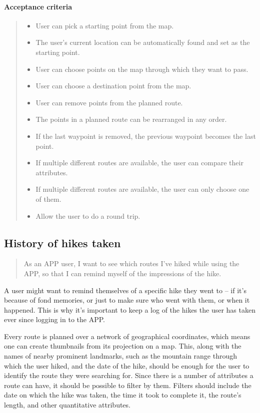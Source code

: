 \paragraph*{Acceptance criteria}
\begin{quote}
\begin{itemize}
    \item User can pick a starting point from the map.
    \item The user's current location can be automatically found and set as the starting point.
    \item User can choose points on the map through which they want to pass.
    \item User can choose a destination point from the map.
    \item User can remove points from the planned route.
    \item The points in a planned route can be rearranged in any order.
    \item If the last waypoint is removed, the previous waypoint becomes the last point.
    \item If multiple different routes are available, the user can compare their attributes.
    \item If multiple different routes are available, the user can only choose one of them.
    \item Allow the user to do a round trip.
\end{itemize}
\end{quote}

\subsection{History of hikes taken}\label{US:map-history}
\begin{quote}
As an APP user, I want to see which routes I've hiked while using the APP, so that I can remind myself of the impressions of the hike.
\end{quote}

A user might want to remind themselves of a specific hike they went to -- if it's because of fond memories, or just to make sure who went with them, or when it happened.
This is why it's important to keep a log of the hikes the user has taken ever since logging in to the APP.

Every route is planned over a network of geographical coordinates, which means one can create thumbnails from its projection on a map.
This, along with the names of nearby prominent landmarks, such as the mountain range through which the user hiked, and the date of the hike, should be enough for the user to identify the route they were searching for.
Since there is a number of attributes a route can have, it should be possible to filter by them.
Filters should include the date on which the hike was taken, the time it took to complete it, the route's length, and other quantitative attributes.

